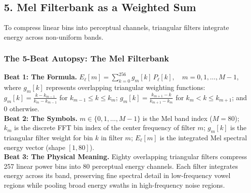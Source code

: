 \documentclass[11pt,a4paper]{article}
\begin{document}
\clearpage

\vspace*{-4.5mm}
\subsection*{5. Mel Filterbank as a Weighted Sum}
\vspace{-2mm}

To compress linear bins into perceptual channels, triangular filters integrate energy across non-uniform bands.

\subsubsection*{The 5-Beat Autopsy: The Mel Filterbank}
\vspace{-2mm}
{\small
\textbf{Beat 1: The Formula.} $E_\ell[m] = \sum_{k=0}^{256} g_m[k] \, P_\ell[k], \quad m = 0, 1, \dots, M-1$, where $g_m[k]$ represents overlapping triangular weighting functions:
$g_m[k] = \frac{k - k_{m-1}}{k_m - k_{m-1}}$ for $k_{m-1} \le k \le k_m$; $g_m[k] = \frac{k_{m+1} - k}{k_{m+1} - k_m}$ for $k_m < k \le k_{m+1}$; and $0$ otherwise.\\[1mm]
\textbf{Beat 2: The Symbols.} $m \in \{0, 1, \dots, M-1\}$ is the Mel band index ($M = 80$); $k_m$ is the discrete FFT bin index of the center frequency of filter $m$; $g_m[k]$ is the triangular filter weight for bin $k$ in filter $m$; $E_\ell[m]$ is the integrated Mel spectral energy vector (shape $[1, 80]$).\\[1mm]
\textbf{Beat 3: The Physical Meaning.} Eighty overlapping triangular filters compress 257 linear power bins into 80 perceptual energy channels. Each filter integrates energy across its band, preserving fine spectral detail in low-frequency vowel regions while pooling broad energy swaths in high-frequency noise regions.
}
\end{document}
